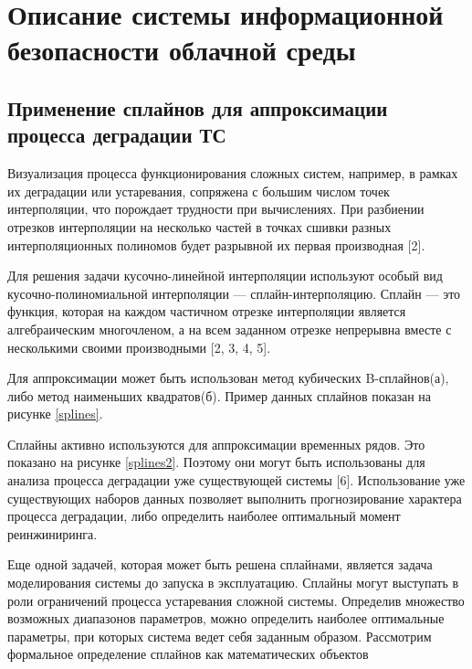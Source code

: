 \section{Описание системы информационной безопасности облачной среды}

\subsection{Применение сплайнов для аппроксимации процесса деградации ТС}
Визуализация процесса функционирования сложных систем, например, в рамках их деградации или устаревания, сопряжена с большим числом точек интерполяции, что порождает трудности при вычислениях. 
При разбиении отрезков интерполяции на несколько частей в точках сшивки разных интерполяционных полиномов будет разрывной их первая производная [2]. 

Для решения задачи кусочно-линейной интерполяции используют особый вид кусочно-полиномиальной интерполяции — сплайн-интерполяцию. 
Сплайн — это функция, которая на каждом частичном отрезке интерполяции является алгебраическим многочленом, а на всем заданном отрезке непрерывна вместе с несколькими своими производными [2, 3, 4, 5].

Для аппроксимации может быть использован метод кубических B-сплайнов(а), либо метод наименьших квадратов(б). 
Пример данных сплайнов показан на рисунке \ref{splines}.


Сплайны активно используются для аппроксимации временных рядов.
Это показано на рисунке \ref{splines2}. 
Поэтому они могут быть использованы для анализа процесса деградации уже существующей системы [6]. 
Использование уже существующих наборов данных позволяет выполнить прогнозирование характера процесса деградации, либо определить наиболее оптимальный момент реинжиниринга.


Еще одной задачей, которая может быть решена сплайнами, является задача моделирования системы до запуска в эксплуатацию. 
Сплайны могут выступать в роли ограничений процесса устаревания сложной системы. 
Определив множество возможных диапазонов параметров, можно определить наиболее оптимальные параметры, при которых система ведет себя заданным образом.
Рассмотрим формальное определение сплайнов как математических объектов


